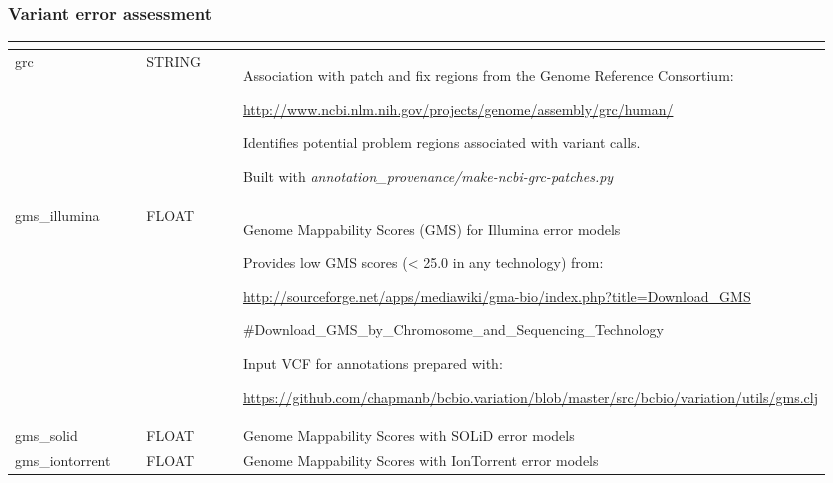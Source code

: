 \documentclass[letterpaper,10pt,english]{sphinxmanual}
\begin{document}
\subsubsection{Variant error assessment}
\label{content/database_schema:variant-error-assessment}
\begin{tabular}{|p{0.317\linewidth}|p{0.317\linewidth}|p{0.317\linewidth}|}
\hline
\textbf{} & \textbf{} & \textbf{}\\\hline

grc
 & 
STRING
 & 
\begin{DUlineblock}{0em}
\item[] Association with patch and fix regions from the Genome Reference Consortium:
\item[] \href{http://www.ncbi.nlm.nih.gov/projects/genome/assembly/grc/human/}{http://www.ncbi.nlm.nih.gov/projects/genome/assembly/grc/human/}
\item[] Identifies potential problem regions associated with variant calls.
\item[] Built with \emph{annotation\_provenance/make-ncbi-grc-patches.py}
\end{DUlineblock}
\\\hline

gms\_illumina
 & 
FLOAT
 & 
\begin{DUlineblock}{0em}
\item[] Genome Mappability Scores (GMS) for Illumina error models
\item[] Provides low GMS scores (\textless{} 25.0 in any technology) from:
\item[] \href{http://sourceforge.net/apps/mediawiki/gma-bio/index.php?title=Download\_GMS}{http://sourceforge.net/apps/mediawiki/gma-bio/index.php?title=Download\_GMS}
\item[] \#Download\_GMS\_by\_Chromosome\_and\_Sequencing\_Technology
\item[] Input VCF for annotations prepared with:
\item[] \href{https://github.com/chapmanb/bcbio.variation/blob/master/src/bcbio/variation/utils/gms.clj}{https://github.com/chapmanb/bcbio.variation/blob/master/src/bcbio/variation/utils/gms.clj}
\end{DUlineblock}
\\\hline

gms\_solid
 & 
FLOAT
 & 
Genome Mappability Scores with SOLiD error models
\\\hline

gms\_iontorrent
 & 
FLOAT
 & 
Genome Mappability Scores with IonTorrent error models
\\\hline


\end{tabular}
\end{document}
